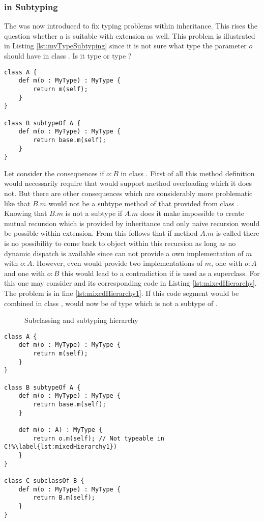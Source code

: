 \subsubsection{\mytype in Subtyping}
\label{ssec:mytypeInSubtype}
The \mytype was now introduced to fix typing problems within
inheritance. This rises the question whether a \mytype is suitable
with extension as well. This problem is illustrated in Listing
\ref{lst:myTypeSubtyping} since it is not sure what type the parameter
$o$ should have in class \B. Is it type \B or type \A? 

\begin{lstlisting}[float,language=ooplss,caption=\mytype within subtyping contexts,label=lst:myTypeSubtyping]
class A {
	def m(o : MyType) : MyType {
		return m(self);
	}
}

class B subtypeOf A {
	def m(o : MyType) : MyType {
		return base.m(self);
	}
}
\end{lstlisting}

Let consider the consequences if $o : B$ in class \B. First of all this
method definition would necessarily require that \ooplss would support
method overloading which it does not. But there are other consequences
which are considerably more problematic like that $B.m$ would not be a
subtype method of that provided from class \A. Knowing that $B.m$ is not
a subtype if $A.m$ does it make impossible to create mutual recursion
which is provided by inheritance and only naive recursion would be
possible within extension. From this follows that if method $A.m$
is called there is no possibility to come back to object \B within
this recursion as long as no dynamic dispatch is available since \B
can not provide a own implementation of $m$ with $o : A$. However,
even \B would provide two implementations of $m$, one with $o : A$
and one with $o : B$ this would lead to a contradiction if \B is used
as a superclass. For this one may consider  and its
corresponding code in Listing \ref{lst:mixedHierarchy}. The problem is in
line \ref{lst:mixedHierarchy1}.  If this code segment would be combined
in class \C, \self would now be of type \C which is not a subtype of \A.

\begin{figure}[ht]
	\centering
	\caption{Subclassing and subtyping hierarchy}
	\label{fig:hierarchy}
\end{figure}

\begin{lstlisting}[float,language=ooplss,caption=Mixed extension and inheritance hierarchy,label=lst:mixedHierarchy]
class A {
	def m(o : MyType) : MyType {
		return m(self);
	}
}

class B subtypeOf A {
	def m(o : MyType) : MyType {
		return base.m(self);
	}

	def m(o : A) : MyType { 
		return o.m(self); // Not typeable in C!%\label{lst:mixedHierarchy1})
	}
}

class C subclassOf B {
	def m(o : MyType) : MyType {
		return B.m(self);
	}
}
\end{lstlisting}

